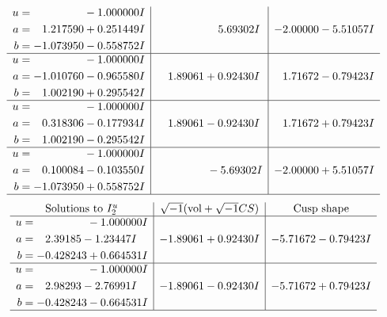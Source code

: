 \documentclass[1p]{elsarticle_modified}
\theoremstyle{definition}
\newcommand{\I}{\sqrt{-1}}
\begin{document}
$$\begin{array}{c|c|c}
\begin{aligned}
u &= \phantom{-0.000000 } -1.000000 I \\
a &= \phantom{-}1.217590 + 0.251449 I \\
b &= -1.073950 - 0.558752 I\end{aligned}
 & \phantom{-0.000000 -}5.69302 I & -2.00000 - 5.51057 I \\ \hline\begin{aligned}
u &= \phantom{-0.000000 } -1.000000 I \\
a &= -1.010760 - 0.965580 I \\
b &= \phantom{-}1.002190 + 0.295542 I\end{aligned}
 & \phantom{-}1.89061 + 0.92430 I & \phantom{-}1.71672 - 0.79423 I \\ \hline\begin{aligned}
u &= \phantom{-0.000000 } -1.000000 I \\
a &= \phantom{-}0.318306 - 0.177934 I \\
b &= \phantom{-}1.002190 - 0.295542 I\end{aligned}
 & \phantom{-}1.89061 - 0.92430 I & \phantom{-}1.71672 + 0.79423 I \\ \hline\begin{aligned}
u &= \phantom{-0.000000 } -1.000000 I \\
a &= \phantom{-}0.100084 - 0.103550 I \\
b &= -1.073950 + 0.558752 I\end{aligned}
 & \phantom{-0.000000 } -5.69302 I & -2.00000 + 5.51057 I\\
 \hline 
 \end{array}$$\newpage$$\begin{array}{c|c|c}  
\text{Solutions to }I^u_{2}& \I (\text{vol} + \sqrt{-1}CS) & \text{Cusp shape}\\
 \hline 
\begin{aligned}
u &= \phantom{-0.000000 } -1.000000 I \\
a &= \phantom{-}2.39185 - 1.23447 I \\
b &= -0.428243 + 0.664531 I\end{aligned}
 & -1.89061 + 0.92430 I & -5.71672 - 0.79423 I \\ \hline\begin{aligned}
u &= \phantom{-0.000000 } -1.000000 I \\
a &= \phantom{-}2.98293 - 2.76991 I \\
b &= -0.428243 - 0.664531 I\end{aligned}
 & -1.89061 - 0.92430 I & -5.71672 + 0.79423 I\\
 \hline 
 \end{array}$$\newpage\newpage\renewcommand{\arraystretch}{1}
\end{document}
